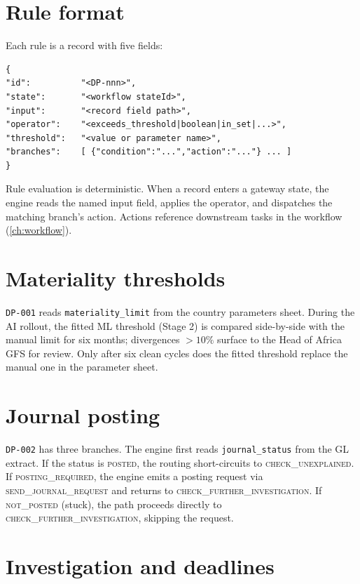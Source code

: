 \documentclass[11pt,a4paper,twoside]{report}
\newcommand{\stateid}[1]{\textsc{\lowercase{#1}}}
\begin{document}
\section{Rule format}

Each rule is a record with five fields:

\begin{lstlisting}[language=jsonx,caption={Generalised rule form.}]
{
"id":          "<DP-nnn>",
"state":       "<workflow stateId>",
"input":       "<record field path>",
"operator":    "<exceeds_threshold|boolean|in_set|...>",
"threshold":   "<value or parameter name>",
"branches":    [ {"condition":"...","action":"..."} ... ]
}
\end{lstlisting}

Rule evaluation is deterministic. When a record enters a gateway
state, the engine reads the named input field, applies the operator,
and dispatches the matching branch's action. Actions reference
downstream tasks in the workflow (\cref{ch:workflow}).

\section{Materiality thresholds}

\texttt{DP-001} reads \texttt{materiality\_limit} from the country
parameters sheet. During the AI rollout, the fitted ML threshold
(Stage 2) is compared side-by-side with the manual limit for six
months; divergences $> 10\%$ surface to the Head of Africa GFS for
review. Only after six clean cycles does the fitted threshold
replace the manual one in the parameter sheet.

\section{Journal posting}

\texttt{DP-002} has three branches. The engine first reads
\texttt{journal\_status} from the GL extract. If the status is
\textsc{posted}, the routing short-circuits to
\stateid{CHECK\_UNEXPLAINED}. If \textsc{posting\_required}, the
engine emits a posting request via
\stateid{SEND\_JOURNAL\_REQUEST} and returns to
\stateid{CHECK\_FURTHER\_INVESTIGATION}. If \textsc{not\_posted}
(stuck), the path proceeds directly to
\stateid{CHECK\_FURTHER\_INVESTIGATION}, skipping the request.

\section{Investigation and deadlines}
\end{document}
